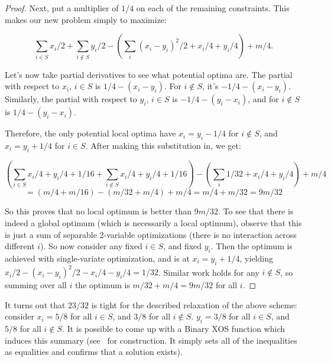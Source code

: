 \begin{proof}
Next, put a multiplier of $1/4$ on each of the remaining constraints. This makes our new problem simply to maximize:

$$\sum_{i \in S} x_i/2 + \sum_{i \notin S} y_i/2 -\left( \sum_i (x_i-y_i)^2/2 +x_i/4 +y_i/4\right) + m/4.$$

Let's now take partial derivatives to see what potential optima are. The partial with respect to $x_i$, $i \in S$ is $1/4-(x_i-y_i)$. For $i \notin S$, it's $-1/4-(x_i-y_i)$. Similarly, the partial with respect to $y_i$, $i \in S$ is $-1/4 - (y_i-x_i)$, and for $i \notin S$ is $1/4 - (y_i-x_i)$. 

Therefore, the only potential local optima have $x_i = y_i -1/4$ for $i \notin S$, and $x_i = y_i +1/4$ for $i \in S$. After making this substitution in, we get:

$$\left(\sum_{i \in S} x_i/4 + y_i/4 + 1/16 + \sum_{i \notin S} x_i/4 + y_i/4 + 1/16 \right) - \left(\sum_i 1/32 + x_i/4+y_i/4 \right)+ m/4$$
$$ = (m/4+m/16) - (m/32 + m/4) + m/4 = m/4+m/32 = 9m/32$$

So this proves that no local optimum is better than $9m/32$. To see that there is indeed a global optimum (which is necessarily a local optimum), observe that this is just a sum of separable 2-variable optimizations (there is no interaction across different $i$). So now consider any fixed $i \in S$, and fixed $y_i$. Then the optimum is achieved with single-variate optimization, and is at $x_i = y_i+1/4$, yielding $x_i/2 - (x_i-y_i)^2/2 - x_i/4-y_i/4 = 1/32$. Similar work holds for any $i \notin S$, so summing over all $i$ the optimum is $m/32 + m/4 = 9m/32$ for all $i$. 
\end{proof}

It turns out that $23/32$ is tight for the described relaxation of the above scheme: consider $x_i = 5/8$ for all $i \in S$, and $3/8$ for all $i \notin S$. $y_i = 3/8$ for all $i \in S$, and $5/8$ for all $i \notin S$. It is possible to come up with a Binary XOS function which induces this summary (see~\cite{BravermanMW18} for construction. It simply sets all of the inequalities as equalities and confirms that a solution exists). 


